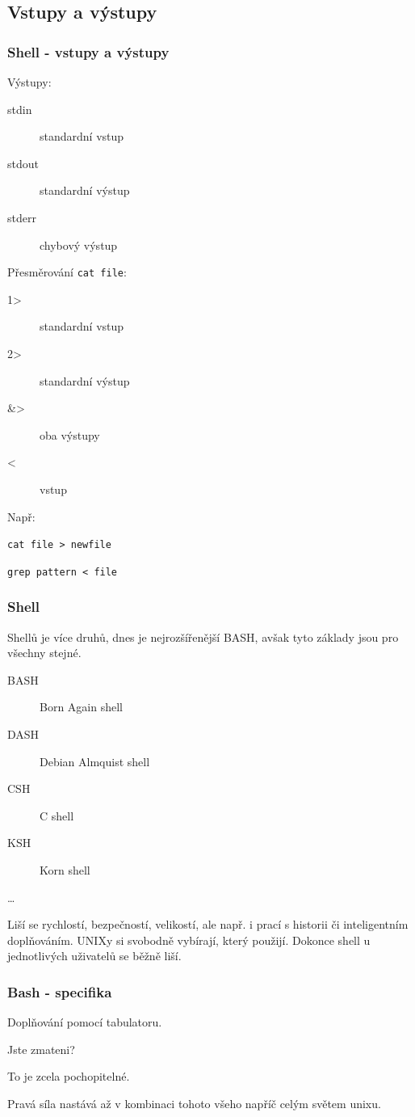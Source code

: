 \documentclass[xetex]{beamer}
\begin{document}
\subsection{Vstupy a výstupy}
\begin{frame}
  \frametitle{Shell - vstupy a výstupy}
  Výstupy:
  \begin{description}
  \item[stdin] standardní vstup
  \item[stdout] standardní výstup
  \item[stderr] chybový výstup
  \end{description} 
  Přesměrování \texttt{cat file}:
  \begin{description}
  \item[1>] standardní vstup
  \item[2>] standardní výstup
  \item[\&>] oba výstupy
  \item[<] vstup
  \end{description}
  Např:
  
  \texttt{cat file > newfile}
  
  \texttt{grep pattern < file}
\end{frame}	

\begin{frame}
  \frametitle{Shell}
 Shellů je více druhů, dnes je nejrozšířenější BASH, avšak tyto základy jsou pro všechny stejné.
   \begin{description}
  \item[BASH] Born Again shell
  \item[DASH] Debian Almquist shell
  \item[CSH] C shell
  \item[KSH] Korn shell
  \item[\ldots]
  \end{description}
  Liší se rychlostí, bezpečností, velikostí, ale např. i prací s historii či inteligentním doplňováním. UNIXy si svobodně vybírají, který použijí. Dokonce shell u jednotlivých uživatelů se běžně liší.
\end{frame}	


\begin{frame}
 \frametitle{Bash - specifika}
 Doplňování pomocí tabulatoru.

 
 \end{frame}	

\begin{frame}
 Jste zmateni?
 
 To je zcela pochopitelné.
 
 \bigskip
 
 Pravá síla nastává až v kombinaci tohoto všeho napříč celým světem unixu.
\end{frame}
\end{document}
